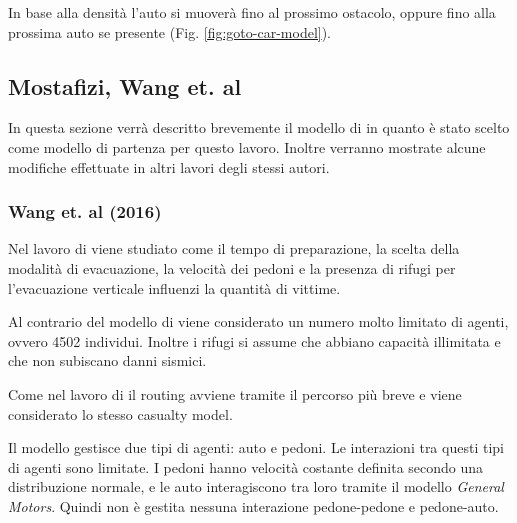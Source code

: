 In base alla densità l'auto si muoverà fino al prossimo ostacolo, oppure fino alla prossima auto se presente (Fig. \ref{fig:goto-car-model}).

\subsection{Mostafizi, Wang et. al}
In questa sezione verrà descritto brevemente il modello di \textcite{wang2016agent} in quanto è stato scelto come modello di partenza per questo lavoro.
Inoltre verranno mostrate alcune modifiche effettuate in altri lavori degli stessi autori.

\subsubsection*{Wang et. al (2016)}

Nel lavoro di \textcite{wang2016agent} viene studiato come il tempo di preparazione, la scelta della modalità di evacuazione, la velocità dei pedoni e la 
presenza di rifugi per l'evacuazione verticale influenzi la quantità di vittime.

Al contrario del modello di \textcite{goto2012tsunami} viene considerato un numero molto limitato di agenti, ovvero 4502 individui. 
Inoltre i rifugi si assume che abbiano capacità illimitata e che non subiscano danni sismici. 

Come nel lavoro di \textcite{goto2012tsunami} il routing avviene tramite il percorso più breve e viene considerato lo stesso casualty model.

\pagebreak

Il modello gestisce due tipi di agenti: auto e pedoni. Le interazioni tra questi tipi di agenti sono limitate.
I pedoni hanno velocità costante definita secondo una distribuzione normale, e le auto interagiscono tra loro 
tramite il modello \textit{General Motors}. Quindi non è gestita nessuna interazione pedone-pedone e pedone-auto.



